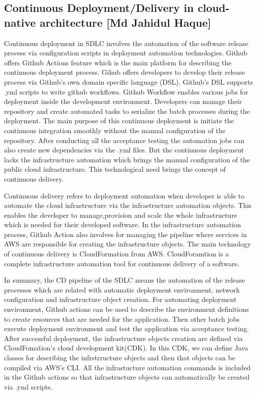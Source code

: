 \subsection{Continuous Deployment/Delivery in cloud-native architecture [Md Jahidul Haque]}

Continuous deployment in SDLC involves the automation of the software release process via configuration scripts in deployment automation technologies. Github offers Github Actions feature which is the main platform for describing the continuous deployment process. Gihub offers developers to develop their release process via Github's own domain specific language (DSL). Github's DSL supports {{.yml}} scripts to write github workflows. Github Workflow enables various jobs for deployment inside the development environment. Developers can manage their repository and create automated tasks to serialize the batch processes during the deployment. The main purpose of this continuous deployment is initiate the continuous integration smoothly without the manual configuration of the repository. After conducting all the acceptance testing the automation jobs can also create new dependencies via the {{.yml}} files. But the continuous deployment lacks the infrastructure automation which brings the manual configuration of the public cloud infrastructure. This technological need brings the concept of continuous delivery.

Continuous delivery refers to deployment automation when developer is able to automate the cloud infrastructure via the infrastructure automation objects. This enables the developer to manage,provision and scale the whole infrastructure which is needed for their developed software. In the infrastructure automation process, Github Action also involves for managing the pipeline where services in AWS are responsible for creating the infrastructure objects. The main technology of continuous delivery is CloudFormation from AWS. CloudForamtion is a complete infrastructure automation tool for continuous delivery of a software. 

In summary, the CD pipeline of the SDLC means the automation of the release processes which are related with automatic deployment environment, network configuration and infrastructure object creation. For automating deployment environment, Github actions can be used to describe the environment definitions to create resources that are needed for the application. Then other batch jobs execute deployment environment and test the application via acceptance testing. After successful deployment, the infrastructure objects creation are defined via CloudFomation's  cloud development kit(CDK). In this CDK, we can define Java classes for describing the infrstrructure objects and then that objects can be compiled via AWS's CLI. All the infrastucture automation commands is included in the Github actions so that infrastructure objects can automatically be created via {{.yml}} scripts.

